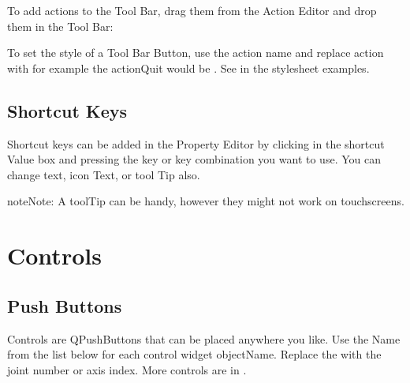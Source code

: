 \documentclass[letterpaper,10pt,english]{sphinxmanual}
\begin{document}

\sphinxAtStartPar
To add actions to the Tool Bar, drag them from the Action Editor and drop them
in the Tool Bar:


\sphinxAtStartPar
To set the style of a Tool Bar Button, use the action name and replace action
with  for example the actionQuit would be . See  in the stylesheet examples.


\section{Shortcut Keys}
\label{\detokenize{menu:shortcut-keys}}
\sphinxAtStartPar
Shortcut keys can be added in the Property Editor by clicking in the shortcut
Value box and pressing the key or key combination you want to use. You can
change text, icon Text, or tool Tip also.


\begin{sphinxadmonition}{note}{Note:}
\sphinxAtStartPar
A toolTip can be handy, however they might not work on touchscreens.
\end{sphinxadmonition}

\sphinxstepscope


\chapter{Controls}
\label{\detokenize{controls:controls}}\label{\detokenize{controls::doc}}
\sphinxAtStartPar
{}


\section{Push Buttons}
\label{\detokenize{controls:push-buttons}}
\sphinxAtStartPar
Controls are QPushButtons that can be placed anywhere you like. Use the Name
from the list below for each control widget objectName. Replace the 
with the joint number or axis index. More controls are in {\hyperref[\detokenize{tools::doc}]{}}.
\end{document}
